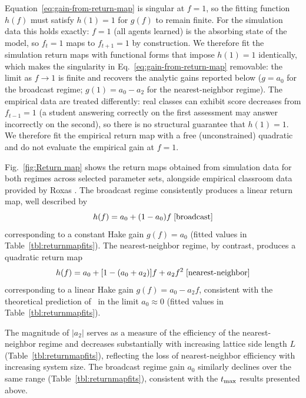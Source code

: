 \documentclass[a4paper,fleqn]{cas-sc}
\begin{document}
    Equation~\eqref{eq:gain-from-return-map} is singular at $f=1$, so the fitting function $h(f)$ must satisfy $h(1)=1$ for $g(f)$ to remain finite. For the simulation data this holds exactly: $f=1$ (all agents learned) is the absorbing state of the model, so $f_t=1$ maps to $f_{t+1}=1$ by construction. We therefore fit the simulation return maps with functional forms that impose $h(1)=1$ identically, which makes the singularity in Eq.~\eqref{eq:gain-from-return-map} removable: the limit as $f\to1$ is finite and recovers the analytic gains reported below ($g=a_0$ for the broadcast regime; $g(1)=a_0-a_2$ for the nearest-neighbor regime). The empirical data are treated differently: real classes can exhibit score decreases from $f_{t-1}=1$ (a student answering correctly on the first assessment may answer incorrectly on the second), so there is no structural guarantee that $h(1)=1$. We therefore fit the empirical return map with a free (unconstrained) quadratic and do not evaluate the empirical gain at $f=1$.

    Fig.~\ref{fig:Return map} shows the return maps obtained from simulation data for both regimes across selected parameter sets, alongside empirical classroom data provided by Roxas \citep{monterola2009}.
    The broadcast regime consistently produces a linear return map, well described by
    \begin{equation}
        h(f) = a_0 + (1-a_0)f \;{\rm [broadcast]}
    \end{equation}
    corresponding to a constant Hake gain $g(f) = a_0$ (fitted values in Table~\ref{tbl:returnmapfits}).
    The nearest-neighbor regime, by contrast, produces a quadratic return map
    \begin{equation}
        h(f) = a_0 + [1-(a_0+a_2)]f + a_2f^2 \;{\rm [nearest\text{-}neighbor]}
    \end{equation}
    corresponding to a linear Hake gain $g(f) = a_0 - a_2 f$, consistent with the theoretical prediction of~\citet{nitta2019mathematical} in the limit $a_0 \approx 0$ (fitted values in Table~\ref{tbl:returnmapfits}).

    The magnitude of $|a_2|$ serves as a measure of the efficiency of the nearest-neighbor regime and decreases substantially with increasing lattice side length $L$ (Table~\ref{tbl:returnmapfits}), reflecting the loss of nearest-neighbor efficiency with increasing system size. The broadcast regime gain $a_0$ similarly declines over the same range (Table~\ref{tbl:returnmapfits}), consistent with the $t_{\rm max}$ results presented above.
\end{document}
